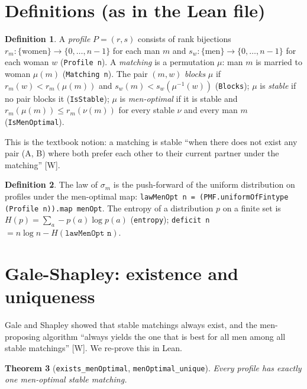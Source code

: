 \documentclass[11pt]{article}
\newtheorem{theorem}{Theorem}
\theoremstyle{definition}
\newtheorem{definition}[theorem]{Definition}
\begin{document}
\section{Definitions (as in the Lean file)}

\begin{definition}
A \emph{profile} $P=(r,s)$ consists of rank bijections $r_m:\{\text{women}\}\to\{0,\dots,n-1\}$ for each man $m$
and $s_w:\{\text{men}\}\to\{0,\dots,n-1\}$ for each woman $w$ (\texttt{Profile n}). A \emph{matching} is a
permutation $\mu$: man $m$ is married to woman $\mu(m)$ (\texttt{Matching n}). The pair $(m,w)$ \emph{blocks}
$\mu$ if $r_m(w)<r_m(\mu(m))$ and $s_w(m)<s_w(\mu^{-1}(w))$ (\texttt{Blocks}); $\mu$ is \emph{stable} if no pair
blocks it (\texttt{IsStable}); $\mu$ is \emph{men-optimal} if it is stable and $r_m(\mu(m))\le r_m(\nu(m))$ for
every stable $\nu$ and every man $m$ (\texttt{IsMenOptimal}).
\end{definition}

This is the textbook notion: a matching is stable ``when there does not exist any pair (A, B) where both prefer
each other to their current partner under the matching'' [W].

\begin{definition}
The law of $\sigma_m$ is the push-forward of the uniform distribution on profiles under the men-optimal map:
\texttt{lawMenOpt n = (PMF.uniformOfFintype (Profile n)).map menOpt}. The entropy of a distribution $p$ on a
finite set is $H(p)=\sum_a -p(a)\log p(a)$ (\texttt{entropy}); \texttt{deficit n} $= n\log n - H(\texttt{lawMenOpt n})$.
\end{definition}

\section{Gale-Shapley: existence and uniqueness}

Gale and Shapley showed that stable matchings always exist, and the men-proposing algorithm ``always yields the
one that is best for all men among all stable matchings'' [W]. We re-prove this in Lean.

\begin{theorem}[\texttt{exists\_menOptimal}, \texttt{menOptimal\_unique}]
Every profile has exactly one men-optimal stable matching.
\end{theorem}
\end{document}
